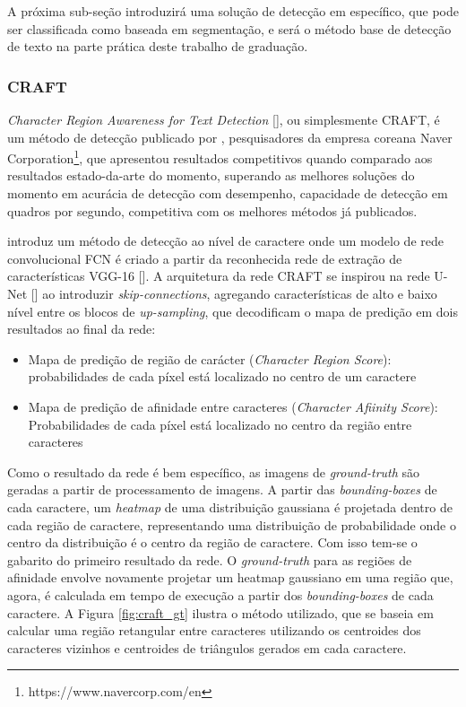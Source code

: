 A próxima sub-seção introduzirá uma solução de detecção em específico, que pode ser classificada como baseada em segmentação, e será o método base de detecção 
de texto na parte prática deste trabalho de graduação.


\subsubsection{CRAFT}\label{craft}
\textit{Character Region Awareness for Text Detection} [], ou simplesmente CRAFT, é um método de detecção publicado por \citeauthor{CRAFT}, 
pesquisadores da empresa coreana Naver Corporation\footnote{https://www.navercorp.com/en}, que apresentou resultados competitivos quando comparado 
aos resultados estado-da-arte do momento, superando as melhores soluções do momento em acurácia de detecção com desempenho, capacidade de detecção em quadros 
por segundo, competitiva com os melhores métodos já publicados.
	
\citeauthor{CRAFT} introduz um método de detecção ao nível de caractere onde um modelo de rede convolucional FCN é criado a partir da reconhecida rede de 
extração de características VGG-16 []. A arquitetura da rede CRAFT se inspirou na rede U-Net [] ao introduzir 
\textit{skip-connections}, agregando características de alto e baixo nível entre os blocos de \textit{up-sampling}, que decodificam o mapa de predição em 
dois resultados ao final da rede:

\begin{itemize}
    \item {Mapa de predição de região de carácter (\textit{Character Region Score}): probabilidades de cada píxel está localizado no centro de um caractere}

    \item {Mapa de predição de afinidade entre caracteres (\textit{Character Afiinity Score}): Probabilidades de cada píxel está localizado no centro da região entre caracteres}
\end{itemize}

Como o resultado da rede é bem específico, as imagens de \textit{ground-truth} são geradas a partir de processamento de imagens. A partir das 
\textit{bounding-boxes} de cada caractere, um \textit{heatmap} de uma distribuição gaussiana é projetada dentro de cada região de caractere, representando 
uma distribuição de probabilidade onde o centro da distribuição é o centro da região de caractere. Com isso tem-se o gabarito do primeiro resultado da rede. 
O \textit{ground-truth} para as regiões de afinidade envolve novamente projetar um heatmap gaussiano em uma região que, agora, é calculada em tempo de 
execução a partir dos \textit{bounding-boxes} de cada caractere. A Figura \ref{fig:craft_gt}  ilustra o método utilizado, que se baseia em calcular uma 
região retangular entre caracteres utilizando os centroides dos caracteres vizinhos e centroides de triângulos gerados em cada caractere.

